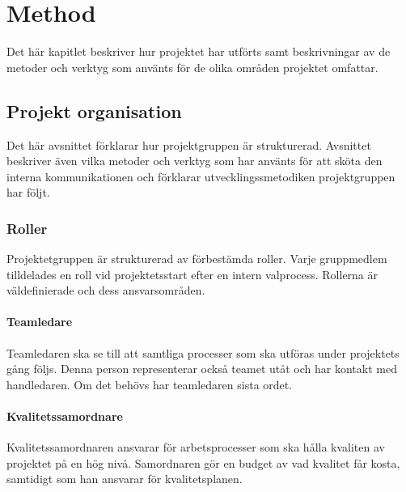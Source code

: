 
\chapter{Method}
\label{cha:method}
Det här kapitlet beskriver hur projektet har utförts samt beskrivningar av de metoder och verktyg som använts för de olika områden projektet omfattar.

\section{Projekt organisation}
Det här avsnittet förklarar hur projektgruppen är strukturerad. Avsnittet beskriver även vilka metoder och verktyg som har använts för att sköta den interna kommunikationen och förklarar utvecklingssmetodiken projektgruppen har följt.

\subsection{Roller}
Projektetgruppen är strukturerad av förbestämda roller. Varje gruppmedlem tilldelades en roll vid projektetsstart efter en intern valprocess. Rollerna är väldefinierade och dess ansvarsområden.

\subsubsection*{Teamledare}
Teamledaren ska se till att samtliga processer som ska utföras under projektets gång följs. Denna person representerar också teamet utåt och har kontakt med handledaren. Om det behövs har teamledaren sista ordet.

\subsubsection*{Kvalitetssamordnare}
Kvalitetssamordnaren ansvarar för arbetsprocesser som ska hålla kvaliten av projektet på en hög nivå. Samordnaren gör en budget av vad kvalitet får kosta, samtidigt som han ansvarar för kvalitetsplanen.

